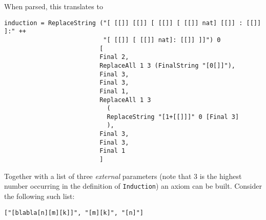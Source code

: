 \documentclass[notitlepage]{report}
\begin{document}
When parsed, this translates to
\begin{verbatim}
induction = ReplaceString ("[ [[]] [[]] [ [[]] [ [[]] nat] [[]] : [[]] ]:" ++
                           "[ [[]] [ [[]] nat]: [[]] ]]") 0
                          [
                          Final 2,
                          ReplaceAll 1 3 (FinalString "[0[]]"),
                          Final 3,
                          Final 3,
                          Final 1,
                          ReplaceAll 1 3
                            (
                            ReplaceString "[1+[[]]]" 0 [Final 3]
                            ),
                          Final 3,
                          Final 3,
                          Final 1
                          ]
\end{verbatim}

Together with a list of three \emph{external} parameters (note that 3 is the
highest number occurring in the definition of \texttt{Induction}) an axiom can
be built. Consider the following such list:
\begin{verbatim}
["[blabla[n][m][k]]", "[m][k]", "[n]"]
\end{verbatim}
\end{document}
